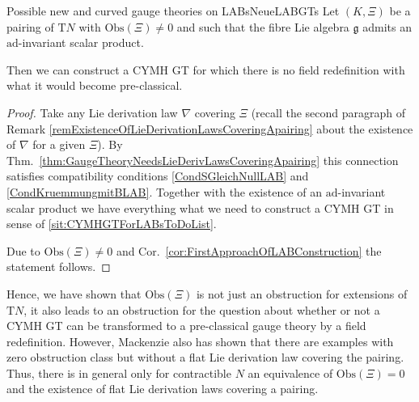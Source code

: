 \begin{theorems}{Possible new and curved gauge theories on LABs}{NeueLABGTs}
Let $(K, \Xi)$ be a pairing of $\mathrm{T}N$ with $\mathrm{Obs}(\Xi) \neq 0$ and such that the fibre Lie algebra $\mathfrak{g}$ admits an $\mathrm{ad}$-invariant scalar product.

Then we can construct a CYMH GT for which there is no field redefinition with what it would become pre-classical.
\end{theorems}

\begin{proof}
\leavevmode\newline
Take any Lie derivation law $\nabla$ covering $\Xi$ (recall the second paragraph of Remark \ref{remExistenceOfLieDerivationLawsCoveringApairing} about the existence of $\nabla$ for a given $\Xi$). By Thm.~\ref{thm:GaugeTheoryNeedsLieDerivLawsCoveringApairing} this connection satisfies compatibility conditions \eqref{CondSGleichNullLAB} and \eqref{CondKruemmungmitBLAB}. Together with the existence of an $\mathrm{ad}$-invariant scalar product we have everything what we need to construct a CYMH GT in sense of \ref{sit:CYMHGTForLABsToDoList}.

Due to $\mathrm{Obs}(\Xi) \neq 0$ and Cor.~\ref{cor:FirstApproachOfLABConstruction} the statement follows.
\end{proof}

Hence, we have shown that $\mathrm{Obs}(\Xi)$ is not just an obstruction for extensions of $\mathrm{T}N$, it also leads to an obstruction for the question about whether or not a CYMH GT can be transformed to a pre-classical gauge theory by a field redefinition. However, Mackenzie also has shown that there are examples with zero obstruction class but without a flat Lie derivation law covering the pairing. Thus, there is in general only for contractible $N$ an equivalence of $\mathrm{Obs}(\Xi) = 0$ and the existence of flat Lie derivation laws covering a pairing.

